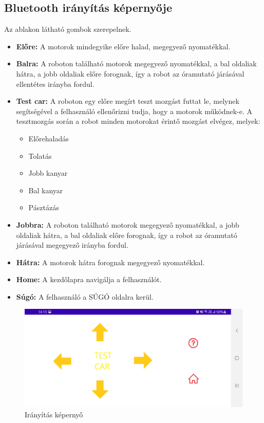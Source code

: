 \documentclass[]{thesis-ekf}
\theoremstyle{definition}
\begin{document}
\subsection{Bluetooth irányítás képernyője}\label{bluetooth-control}
Az ablakon  látható gombok szerepelnek.
\begin{itemize}
	\item \textbf{Előre:} A motorok mindegyike előre halad, megegyező nyomatékkal.
	\item \textbf{Balra: }A roboton található motorok megegyező nyomatékkal, a bal oldaliak hátra, a jobb oldaliak előre forognak, így a robot az óramutató járásával ellentétes irányba fordul.
	\item \textbf{Test car:} A roboton egy előre megírt teszt mozgást futtat le, melynek segítségével a felhasználó ellenőrizni tudja, hogy a motorok működnek-e. A tesztmozgás során a robot minden motorokat érintő mozgást elvégez, melyek:
	\begin{itemize}
		\item Előrehaladás
		\item Tolatás
		\item Jobb kanyar
		\item Bal kanyar
		\item Pásztázás
	\end{itemize}
	\item \textbf{Jobbra:} A roboton található motorok megegyező nyomatékkal, a jobb oldaliak hátra, a bal oldaliak előre forognak, így a robot az óramutató járásával megegyező irányba fordul.
	\item \textbf{Hátra:} A motorok hátra forognak megegyező nyomatékkal.
	\item \textbf{Home:} A kezdőlapra navigálja a felhasználót.
	\item \textbf{Súgó:} A felhasználó a SÚGÓ oldalra kerül.
\end{itemize}
\begin{figure}[h]
	\centering
	\includegraphics[width=\columnwidth]{images/app_screen/control_screen}
	\caption{Irányítás képernyő}
	\label{bluetooth-screen}
\end{figure}
\end{document}
